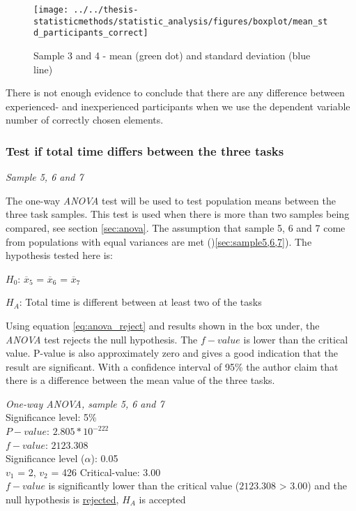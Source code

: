 \begin{figure}[H]
	\centering
	\texttt{[image: ../../thesis-statisticmethods/statistic\_analysis/figures/boxplot/mean\_std\_participants\_correct]}
	\caption{Sample 3 and 4 - mean (green dot) and standard deviation (blue line)}
	\label{fig:meanstdparticipantscorrect}
\end{figure}

There is not enough evidence to conclude that there are any difference between experienced- and inexperienced participants when we use the dependent variable number of correctly chosen elements. 

\subsubsection[Sample 5, 6 and 7]{Test if total time differs between the three tasks}\label{sec:anova_result} %
\textit{Sample 5, 6 and 7}\newline

The one-way \textit{ANOVA} test will be used to test population means between the three task samples. This test is used when there is more than two samples being compared, see section \ref{sec:anova}. The assumption that sample 5, 6 and 7 come from populations with equal variances are met ()\ref{sec:sample5,6,7}). The hypothesis tested here is: \\

\centerline{$H_{0}$: $\overline{x}_5$ = $\overline{x}_6$ = $\overline{x}_7$}
\centerline{$H_{A}$: Total time is different between at least two of the tasks}

Using equation \ref{eq:anova_reject} and results shown in the box under, the \textit{ANOVA} test rejects the null hypothesis. The $f-value$ is lower than the critical value. P-value is also approximately zero and gives a good indication that the result are significant. With a confidence interval of 95\% the author claim that there is a difference between the mean value of the three tasks.

 \begin{center}
	\begin{tcolorbox}[box align=center,width=\textwidth-5cm]
		\centering
		\textit{One-way \textit{ANOVA}, sample 5, 6 and 7}\\
		Significance level: 5\%  \\[0.5cm]
		
		$P-value$: $2.805 * 10^{-222}$ \\
		$f-value$: $2123.308$ \\
		Significance level ($\alpha$): 0.05 \\
		$v_1$ = 2, $v_2$ = 426
		Critical-value: 3.00 \\[0.2cm] %
		
		$f-value$ is significantly lower than the critical value ($2123.308$ > $3.00$) and the null hypothesis is \underline{rejected}, $H_A$ is accepted\\[0.5cm]
	\end{tcolorbox} 
\end{center}

